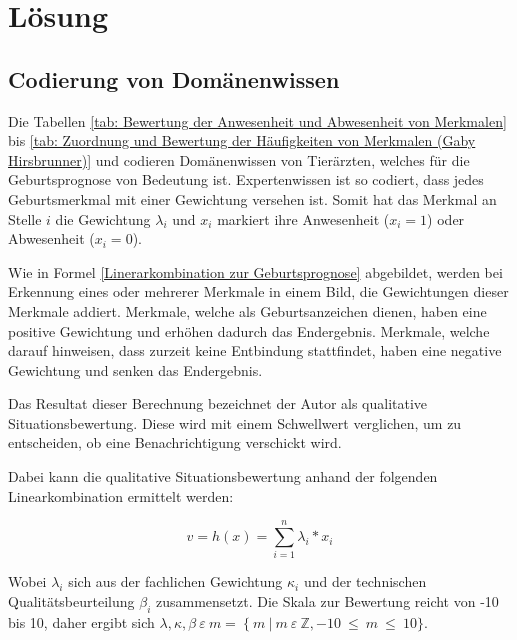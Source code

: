 
	
\chapter{Lösung}

\section{Codierung von Domänenwissen}

Die Tabellen \ref{tab: Bewertung der Anwesenheit und Abwesenheit von Merkmalen} bis \ref{tab: Zuordnung und Bewertung der Häufigkeiten von Merkmalen (Gaby Hirsbrunner)} und  codieren Domänenwissen von Tierärzten, welches für die Geburtsprognose von Bedeutung ist. Expertenwissen ist so codiert, dass jedes Geburtsmerkmal mit einer Gewichtung versehen ist. Somit hat das Merkmal an Stelle $i$ die Gewichtung $\lambda_{i}$ und $x_{i}$ markiert ihre Anwesenheit ($x_i = 1$) oder Abwesenheit ($x_i = 0$).



Wie in Formel \ref{Linerarkombination zur Geburtsprognose} abgebildet, werden bei Erkennung eines oder mehrerer Merkmale in einem Bild, die Gewichtungen dieser Merkmale addiert. Merkmale, welche als Geburtsanzeichen dienen, haben eine positive Gewichtung und erhöhen dadurch das Endergebnis. Merkmale, welche darauf hinweisen, dass zurzeit keine Entbindung stattfindet, haben eine negative Gewichtung und senken das Endergebnis.


Das Resultat dieser Berechnung bezeichnet der Autor als \flqq qualitative Situationsbewertung\frqq. Diese wird mit einem Schwellwert verglichen, um zu entscheiden, ob eine Benachrichtigung verschickt wird.

Dabei kann die qualitative Situationsbewertung anhand der folgenden Linearkombination ermittelt werden: 



\begin{equation}\label{Linerarkombination zur Geburtsprognose}
v = h(x) = \sum_{i=1}^n \lambda_{i}*x_{i}
\end{equation}

 
Wobei $\lambda_{i}$ sich aus der fachlichen Gewichtung $\kappa_{i}$ und der technischen Qualitätsbeurteilung $\beta_{i}$ zusammensetzt. Die Skala zur Bewertung reicht von -10 bis 10, daher ergibt sich $ \lambda, \kappa, \beta   \: \varepsilon \: m =\:   \{ \:  m \: | \:  m \:  \varepsilon \:  \mathbb{Z}, -10 \:  \leq \: m \: \leq \:  10\} $.

